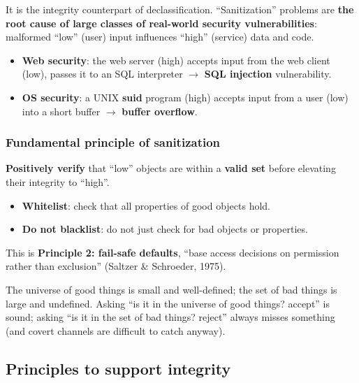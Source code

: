 It is the integrity counterpart of declassification. ``Sanitization'' problems are \textbf{the root cause of large classes of real-world security vulnerabilities}: malformed ``low'' (user) input influences ``high'' (service) data and code.

\begin{example}
\begin{itemize}
    \item \textbf{Web security}: the web server (high) accepts input from the web client (low), passes it to an SQL interpreter $\to$ \textbf{SQL injection} vulnerability.
    \item \textbf{OS security}: a UNIX \textbf{suid} program (high) accepts input from a user (low) into a short buffer $\to$ \textbf{buffer overflow}.
\end{itemize}
\end{example}

\subsubsection{Fundamental principle of sanitization}

\textbf{Positively verify} that ``low'' objects are within a \textbf{valid set} before elevating their integrity to ``high''.
\begin{itemize}
    \item \textbf{Whitelist}: check that all properties of good objects hold.
    \item \textbf{Do not blacklist}: do not just check for bad objects or properties.
\end{itemize}
This is \textbf{Principle 2: fail-safe defaults}, ``base access decisions on permission rather than exclusion'' (Saltzer \& Schroeder, 1975).

The universe of good things is small and well-defined; the set of bad things is large and undefined. Asking ``is it in the universe of good things? accept'' is sound; asking ``is it in the set of bad things? reject'' always misses something (and covert channels are difficult to catch anyway).

\subsection{Principles to support integrity}

